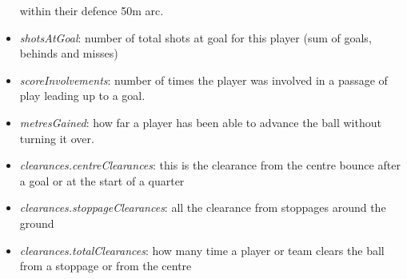 \begin{itemize}
  within their defence 50m arc.\\
\item
  \emph{shotsAtGoal}: number of total shots at goal for this player (sum
  of goals, behinds and misses)
\item
  \emph{scoreInvolvements}: number of times the player was involved in a
  passage of play leading up to a goal.
\item
  \emph{metresGained}: how far a player has been able to advance the
  ball without turning it over.\\
\item
  \emph{clearances.centreClearances}: this is the clearance from the
  centre bounce after a goal or at the start of a quarter
\item
  \emph{clearances.stoppageClearances}: all the clearance from stoppages
  around the ground
\item
  \emph{clearances.totalClearances}: how many time a player or team
  clears the ball from a stoppage or from the centre
\end{itemize}



\address{%
Harriet Mason\\
Monash University\\%
Department of Econometrics and Business Statistics\\ Melbourne,
Australia\\
%
\url{https://www.britannica.com/animal/quokka}\\%
\textit{ORCiD: \href{https://orcid.org/0000-1721-1511-1101}{0000-1721-1511-1101}}\\%
\href{mailto:hmas0003@student.monash.edu}{\nolinkurl{hmas0003@student.monash.edu}}%
}

\address{%
Stuart Lee\\
Genentech\\%
\\
%
\url{https://stuartlee.org}\\%
\textit{ORCiD: \href{https://orcid.org/0000-0003-1179-8436}{0000-0003-1179-8436}}\\%
\href{mailto:stuart.andrew.lee@gmail.com}{\nolinkurl{stuart.andrew.lee@gmail.com}}%
}

\address{%
Ursula Laa\\
University of Natural Resources and Life Sciences\\%
Institute of Statistics\\ Vienna, Austria\\
%
\url{https://uschilaa.github.io}\\%
\textit{ORCiD: \href{https://orcid.org/0000-0002-0249-6439}{0000-0002-0249-6439}}\\%
\href{mailto:ursula.laa@boku.ac.at}{\nolinkurl{ursula.laa@boku.ac.at}}%
}


